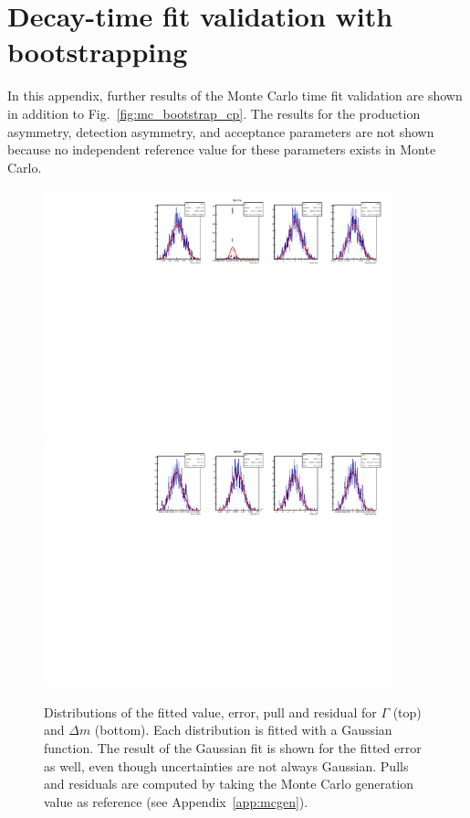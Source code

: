 \section{Decay-time fit validation with bootstrapping}
\label{app:mcbootstrap}

In this appendix, further results of the Monte Carlo time fit validation are shown in addition to Fig.~\ref{fig:mc_bootstrap_cp}. The results for the production asymmetry, detection asymmetry, and acceptance parameters are not shown because no independent reference value for these parameters exists in Monte Carlo.
\begin{figure}[htpb]
        \begin{center}
                \includegraphics[width=0.9\textwidth]{AA-Appdx-mcbootstrap/figs/1DPullPlot_Gamma_SSbarAccAsymmFTFloatDMGammaConstrAllSamples.pdf} \\
                \includegraphics[width=0.9\textwidth]{AA-Appdx-mcbootstrap/figs/1DPullPlot_deltaM_SSbarAccAsymmFTFloatDMGammaConstrAllSamples.pdf}
        \end{center}
        \vspace{-2mm}
        \caption{Distributions of the fitted value, error, pull and residual for $\Gamma$ (top) and $\Delta m$ (bottom). Each distribution is fitted with a Gaussian function. The result of the Gaussian fit is shown for the fitted error as well, even though uncertainties are not always Gaussian. Pulls and residuals are computed by taking the Monte Carlo generation value as reference (see Appendix~\ref{app:mcgen}).}
        \label{fig:mc_bootstrap_decay}
\end{figure}

